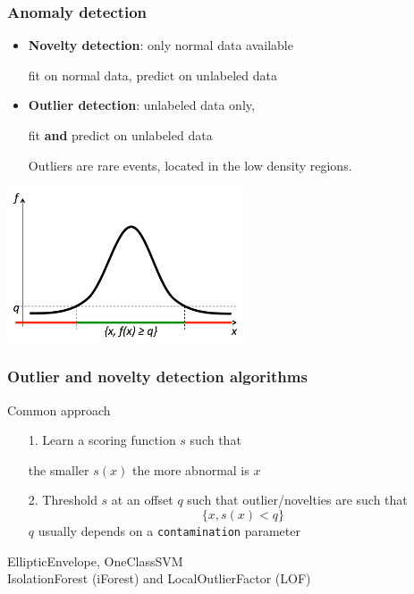 \documentclass[slidetop,11pt]{beamer}
\begin{document}
\begin{frame}\frametitle{Anomaly detection}
    
\begin{itemize}
\item \textbf{Novelty detection}: only normal data available
\begin{center}
fit on normal data, predict on unlabeled data
\end{center}
\item \textbf{Outlier detection}: unlabeled data only,
\begin{center}
fit \textbf{and} predict on unlabeled data
\end{center}

Outliers are rare events, located in the low density regions.
\end{itemize}
\begin{center}
\includegraphics[width=7cm]{dls3.pdf}
\end{center}

\end{frame}


\begin{frame}
\frametitle{Outlier and novelty detection algorithms}

Common approach

\vspace{0.5cm}

\begin{enumerate}
\item[1.] Learn a scoring function $s$ such that
\begin{center}
the smaller $s(x)$ the more abnormal is $x$
\end{center}

\vspace{0.5cm}

\item[2.] Threshold $s$ at an offset $q$ such that outlier/novelties are such that
\begin{equation*}
\{x, s(x) < q \}
\end{equation*}
$q$ usually depends on a \texttt{contamination} parameter
\end{enumerate}

\begin{center}
EllipticEnvelope, OneClassSVM \\
IsolationForest (iForest) and LocalOutlierFactor (LOF)
\end{center}

\end{frame}
\end{document}
